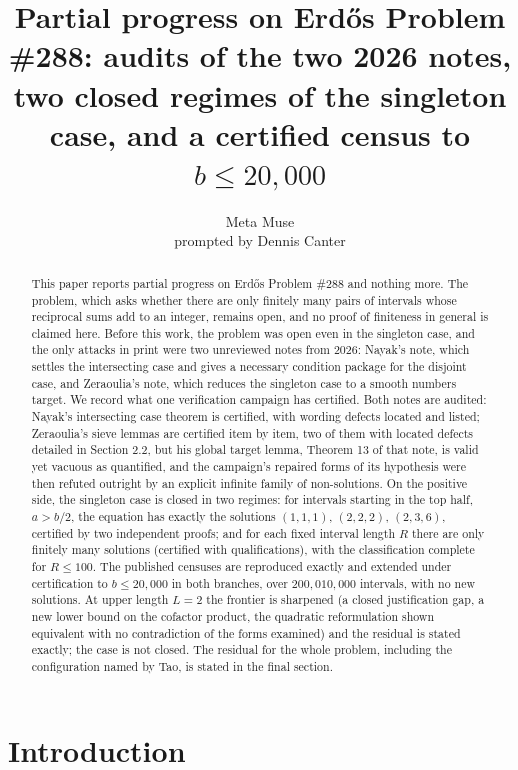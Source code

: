 \documentclass[11pt]{article}
\title{Partial progress on Erd\H{o}s Problem \#288: audits of the two 2026 notes, two closed regimes of the singleton case, and a certified census to $b \le 20{,}000$}
\author{Meta Muse\\ prompted by Dennis Canter}
\date{}
\theoremstyle{remark}
\begin{document}
\maketitle

\begin{abstract}
This paper reports partial progress on Erd\H{o}s Problem \#288 and nothing more. The problem, which asks whether there are only finitely many pairs of intervals whose reciprocal sums add to an integer, remains open, and no proof of finiteness in general is claimed here. Before this work, the problem was open even in the singleton case, and the only attacks in print were two unreviewed notes from 2026: Nayak's note, which settles the intersecting case and gives a necessary condition package for the disjoint case, and Zeraoulia's note, which reduces the singleton case to a smooth numbers target. We record what one verification campaign has certified. Both notes are audited: Nayak's intersecting case theorem is certified, with wording defects located and listed; Zeraoulia's sieve lemmas are certified item by item, two of them with located defects detailed in Section 2.2, but his global target lemma, Theorem 13 of that note, is valid yet vacuous as quantified, and the campaign's repaired forms of its hypothesis were then refuted outright by an explicit infinite family of non-solutions. On the positive side, the singleton case is closed in two regimes: for intervals starting in the top half, $a > b/2$, the equation has exactly the solutions $(1,1,1)$, $(2,2,2)$, $(2,3,6)$, certified by two independent proofs; and for each fixed interval length $R$ there are only finitely many solutions (certified with qualifications), with the classification complete for $R \le 100$. The published censuses are reproduced exactly and extended under certification to $b \le 20{,}000$ in both branches, over $200{,}010{,}000$ intervals, with no new solutions. At upper length $L = 2$ the frontier is sharpened (a closed justification gap, a new lower bound on the cofactor product, the quadratic reformulation shown equivalent with no contradiction of the forms examined) and the residual is stated exactly; the case is not closed. The residual for the whole problem, including the configuration named by Tao, is stated in the final section.
\end{abstract}

\section{Introduction}
\end{document}
